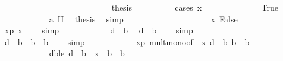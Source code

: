 \begin{isabellebody}
\ \ \ \ \ \ \isamarkupfalse%
\isanewline
\ \ \ \ \ \ \ \ \isamarkupfalse%
\ {}\isanewline
\ \ \ \ \ \ \ \ \isamarkupfalse%
\ {\isacharquery}{\kern0pt}thesis\isanewline
\ \ \ \ \ \ \ \ \isamarkupfalse%
\ {\isacharparenleft}{\kern0pt}cases\ {\isachardoublequoteopen}x\ {\isacharequal}{\kern0pt}\ {}{\isachardoublequoteclose}{\isacharparenright}{\kern0pt}\isanewline
\ \ \ \ \ \ \ \ \ \ \isamarkupfalse%
\ True\isanewline
\ \ \ \ \ \ \ \ \ \ \isamarkupfalse%
\ a\ H\ \isamarkupfalse%
\ {\isacharquery}{\kern0pt}thesis\ \isamarkupfalse%
\ simp\isanewline
\ \ \ \ \ \ \ \ \isamarkupfalse%
\isanewline
\ \ \ \ \ \ \ \ \ \ \isamarkupfalse%
\ x{}{\isacharcolon}{\kern0pt}\ False\isanewline
\ \ \ \ \ \ \ \ \ \ \isamarkupfalse%
\ \isamarkupfalse%
\ xp{\isacharcolon}{\kern0pt}\ {\isachardoublequoteopen}x\ {\isachargreater}{\kern0pt}\ {}{\isachardoublequoteclose}\ \isamarkupfalse%
\ simp\isanewline
\ \ \ \ \ \ \ \ \ \ \isamarkupfalse%
\ {\isacartoucheopen}d\ {\isacharless}{\kern0pt}\ b{\isacartoucheclose}\ \isamarkupfalse%
\ {\isachardoublequoteopen}d\ {\isasymle}\ b\ {\isacharminus}{\kern0pt}\ {}{\isachardoublequoteclose}\ \isamarkupfalse%
\ simp\isanewline
\ \ \ \ \ \ \ \ \ \ \isamarkupfalse%
\ \isamarkupfalse%
\ {\isachardoublequoteopen}d\ {\isacharasterisk}{\kern0pt}\ b\ {\isasymle}\ b\ {\isacharasterisk}{\kern0pt}\ {\isacharparenleft}{\kern0pt}b\ {\isacharminus}{\kern0pt}\ {}{\isacharparenright}{\kern0pt}{\isachardoublequoteclose}\ \isamarkupfalse%
\ simp\isanewline
\ \ \ \ \ \ \ \ \ \ \isamarkupfalse%
\ xp\ mult{\isacharunderscore}{\kern0pt}mono{\isacharbrackleft}{\kern0pt}of\ {\isachardoublequoteopen}{}{\isachardoublequoteclose}\ {\isachardoublequoteopen}x{\isachardoublequoteclose}\ {\isachardoublequoteopen}d\ {\isacharasterisk}{\kern0pt}\ b{\isachardoublequoteclose}\ {\isachardoublequoteopen}b\ {\isacharasterisk}{\kern0pt}\ {\isacharparenleft}{\kern0pt}b\ {\isacharminus}{\kern0pt}\ {}{\isacharparenright}{\kern0pt}{\isachardoublequoteclose}{\isacharbrackright}{\kern0pt}\isanewline
\ \ \ \ \ \ \ \ \ \ \isamarkupfalse%
\ dble{\isacharcolon}{\kern0pt}\ {\isachardoublequoteopen}d\ {\isacharasterisk}{\kern0pt}\ b\ {\isasymle}\ x\ {\isacharasterisk}{\kern0pt}\ b\ {\isacharasterisk}{\kern0pt}\ {\isacharparenleft}{\kern0pt}b\ {\isacharminus}{\kern0pt}\ {}{\isacharparenright}{\kern0pt}{\isachardoublequoteclose}\ \isamarkupfalse%

\end{isabellebody}
